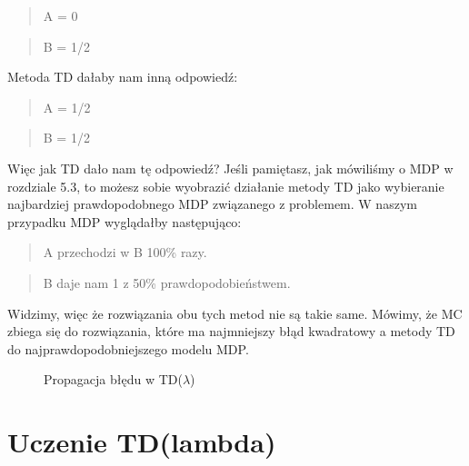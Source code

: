 \begin{quote}
A = 0
\end{quote}
\begin{quote}
B = 1/2
\end{quote}

\noindent Metoda TD dałaby nam inną odpowiedź:

\begin{quote}
A = 1/2
\end{quote}
\begin{quote}
B = 1/2
\end{quote}

\noindent Więc jak TD dało nam tę odpowiedź? Jeśli pamiętasz, jak mówiliśmy o MDP w rozdziale 5.3, to możesz sobie wyobrazić działanie metody TD jako wybieranie najbardziej prawdopodobnego MDP związanego z problemem. W naszym przypadku MDP wyglądałby następująco:

\begin{quote}
A przechodzi w B 100\% razy.
\end{quote}
\begin{quote}
B daje nam 1 z 50\% prawdopodobieństwem.
\end{quote}

\noindent Widzimy, więc że rozwiązania obu tych metod nie są takie same. Mówimy, że MC zbiega się do rozwiązania, które ma najmniejszy błąd kwadratowy a metody TD do najprawdopodobniejszego modelu MDP.


\clearpage
\begin{figure}[H]
\centering

\caption{Propagacja błędu w TD($\lambda$)}
\end{figure}
\clearpage

\section{Uczenie TD(lambda)}

